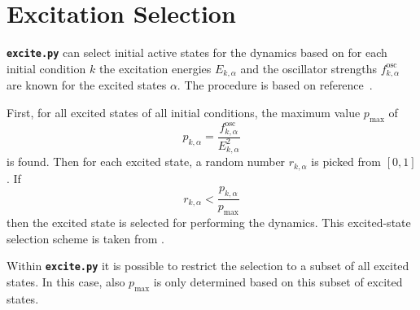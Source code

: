 \documentclass[a4paper,11pt,DIV=15,openany,twoside=false]{scrbook}
\newcommand{\ttt}[1]{\textbf{\texttt{#1}}}
\begin{document}
\section{Excitation Selection}\label{met:exc_selection}

\ttt{excite.py} can select initial active states for the dynamics based on for each initial condition $k$ the excitation energies $E_{k,\alpha}$ and the oscillator strengths $f^{\text{osc}}_{k,\alpha}$ are known for the excited states $\alpha$. The procedure is based on reference~\cite{Barbatti2011}.

First, for all excited states of all initial conditions, the maximum value $p_{\text{max}}$ of 
\begin{equation}
  p_{k,\alpha}=\frac{f^{\text{osc}}_{k,\alpha}}{E_{k,\alpha}^2} \label{eq:exc_prob}
\end{equation}
is found. Then for each excited state, a random number $r_{k,\alpha}$ is picked from $[0,1]$. If
\begin{equation}
  r_{k,\alpha}<\frac{p_{k,\alpha}}{p_{\text{max}}}
\end{equation}
then the excited state is selected for performing the dynamics. This excited-state selection scheme is taken from \cite{Barbatti2011}.

Within \ttt{excite.py} it is possible to restrict the selection to a subset of all excited states. In this case, also $p_{\text{max}}$ is only determined based on this subset of excited states.
\end{document}
